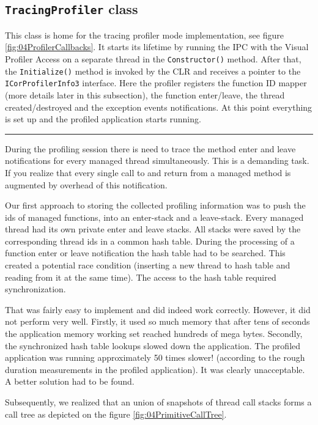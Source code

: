 \subsection{\texttt{TracingProfiler} class}
This class is home for the tracing profiler mode implementation, see figure \ref{fig:04ProfilerCallbacks}. It starts its lifetime by running the IPC with the Visual Profiler Access on a separate thread in the \texttt{Constructor()} method. After that, the \texttt{Initialize()} method is invoked by the CLR and receives a pointer to the \texttt{ICorProfilerInfo3} interface. Here the profiler registers the function ID mapper (more details later in this subsection), the function enter/leave, the thread created/destroyed and the exception events notifications. At this point everything is set up and the profiled application starts running.

\begin{center}
\rule{300pt}{1.5pt}
\end{center}
During the profiling session there is need to trace the method enter and leave notifications for every managed thread simultaneously. This is a demanding task. If you realize that every single call to and return from a managed method is augmented by overhead of this notification. 

Our first approach to storing the collected profiling information was to push the ids of managed functions, into an enter-stack and a leave-stack. Every managed thread had its own private enter and leave stacks. All stacks were saved by the corresponding thread ids in a common hash table. During the processing of a function enter or leave notification the hash table had to be searched. This created a potential race condition (inserting a new thread to hash table and reading from it at the same time). The access to the hash table required synchronization.

That was fairly easy to implement and did indeed work correctly. However, it did not perform very well. Firstly, it used so much memory that after tens of seconds the application memory working set reached hundreds of mega bytes. Secondly, the synchronized hash table lookups slowed down the application. The profiled application was running approximately 50 times slower! (according to the rough duration measurements in the profiled application). It was clearly unacceptable. A better solution had to be found. 

Subsequently, we realized that an union of snapshots of thread call stacks forms a call tree as depicted on the figure \ref{fig:04PrimitiveCallTree}.


